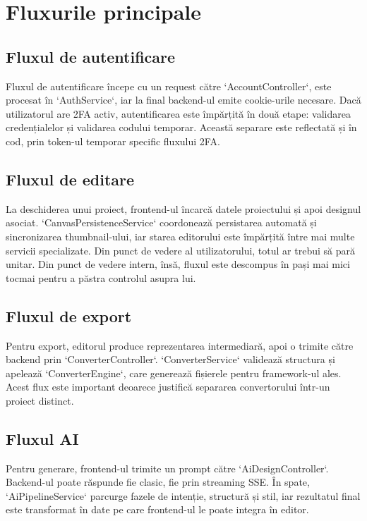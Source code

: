 \section{Fluxurile principale}

\subsection{Fluxul de autentificare}

Fluxul de autentificare începe cu un request către `AccountController`, este procesat în `AuthService`, iar la final backend-ul emite cookie-urile necesare. Dacă utilizatorul are 2FA activ, autentificarea este împărțită în două etape: validarea credențialelor și validarea codului temporar. Această separare este reflectată și în cod, prin token-ul temporar specific fluxului 2FA.

\subsection{Fluxul de editare}

La deschiderea unui proiect, frontend-ul încarcă datele proiectului și apoi designul asociat. `CanvasPersistenceService` coordonează persistarea automată și sincronizarea thumbnail-ului, iar starea editorului este împărțită între mai multe servicii specializate. Din punct de vedere al utilizatorului, totul ar trebui să pară unitar. Din punct de vedere intern, însă, fluxul este descompus în pași mai mici tocmai pentru a păstra controlul asupra lui.

\subsection{Fluxul de export}

Pentru export, editorul produce reprezentarea intermediară, apoi o trimite către backend prin `ConverterController`. `ConverterService` validează structura și apelează `ConverterEngine`, care generează fișierele pentru framework-ul ales. Acest flux este important deoarece justifică separarea convertorului într-un proiect distinct.

\subsection{Fluxul AI}

Pentru generare, frontend-ul trimite un prompt către `AiDesignController`. Backend-ul poate răspunde fie clasic, fie prin streaming SSE. În spate, `AiPipelineService` parcurge fazele de intenție, structură și stil, iar rezultatul final este transformat în date pe care frontend-ul le poate integra în editor.

